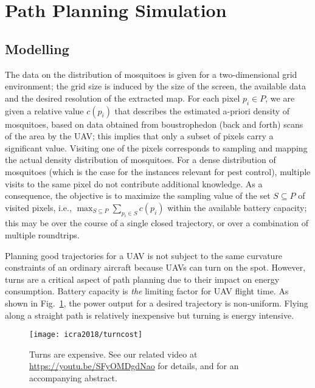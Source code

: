 \section[Path Planning Simulation]{Path Planning Simulation}

\newcommand{\revised}[1]{{\color{red}#1}}

\subsection{Modelling}
\label{subsec:modelling}
The data on the distribution of mosquitoes is given for a two-dimensional grid environment; the grid size
is induced by the size of the screen, the available data and the desired resolution of the extracted map. 
For each pixel $p_i\in P$, we are given a relative value
$c(p_i)$ that describes the estimated a-priori density of mosquitoes, based on data obtained from boustrophedon (back and forth) scans of the area by the UAV;
this implies that only a subset of pixels carry a significant value.
Visiting one of the pixels corresponds to sampling and mapping the actual density distribution of mosquitoes. 
For a dense distribution of mosquitoes
(which is the case for the instances relevant for pest control), multiple visits to the same pixel do not contribute additional
knowledge. As a consequence, the objective is to maximize the sampling value of the set $S\subseteq P$ of visited pixels, 
i.e., $\max_{S\subseteq P} \sum_{p_i\in S} c(p_i)$ {within the available battery capacity}; this may be over the course of a single closed trajectory, or over
a combination of multiple roundtrips. 

Planning good trajectories for a UAV is not subject to the same curvature constraints of an ordinary aircraft
because UAVs can turn on the spot. However, turns are a critical aspect of path
planning due to their impact on energy consumption.  Battery capacity is {\em the} limiting factor for  UAV flight time. As shown in Fig.~\ref{fig:turncost}, 
the power output for a desired trajectory is non-uniform.  Flying along a straight path
is relatively inexpensive but turning is energy intensive. 

\begin{figure}[h]
\begin{center}
\texttt{[image: icra2018/turncost]}
\caption[Mosquito hunting drone]{Turns are expensive. See our related video at
\url{https://youtu.be/SFyOMDgdNao} for details, and
\cite{becker2017zapping} for an accompanying abstract.} \label{fig:turncost}
\end{center}
\vspace{-1em}
\end{figure}



